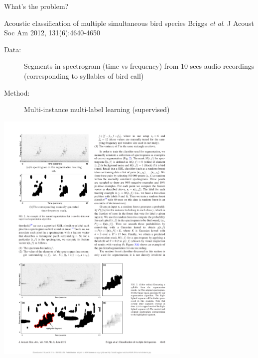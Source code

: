 \documentclass[pdf]{beamer}
\begin{document}
\begin{frame}{What's the problem?}
\begin{exampleblock}{Acoustic classification of multiple simultaneous bird species \vskip-1mm{\tiny Briggs \textit{et al}. J Acoust Soc Am 2012, 131(6):4640-4650}}
\begin{description}
	\item[Data:] Segments in spectrogram (time vs frequency) from 10 secs audio recordings (corresponding to syllables of bird call)
	\item[Method:] Multi-instance multi-label learning (supervised)
\end{description}
\begin{center}
	\includegraphics[width=0.7\textwidth]{briggs.pdf}
\end{center}
\end{exampleblock}
\end{frame}
\end{document}
